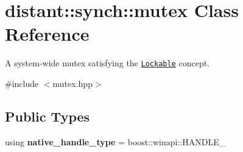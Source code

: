 \hypertarget{classdistant_1_1synch_1_1mutex}{}\section{distant\+:\+:synch\+:\+:mutex Class Reference}
\label{classdistant_1_1synch_1_1mutex}


A system-\/wide mutex satisfying the \href{http://en.cppreference.com/w/cpp/concept/Lockable}{\tt Lockable} concept.  




{\ttfamily \#include $<$mutex.\+hpp$>$}

\subsection*{Public Types}
\begin{DoxyCompactItemize}
\item 
\mbox{\label{classdistant_1_1synch_1_1mutex_a76302be241c3a302037958dbe59577e8}} 
using {\bfseries native\+\_\+handle\+\_\+type} = boost\+::winapi\+::\+H\+A\+N\+D\+L\+E\+\_\+
\end{DoxyCompactItemize}
